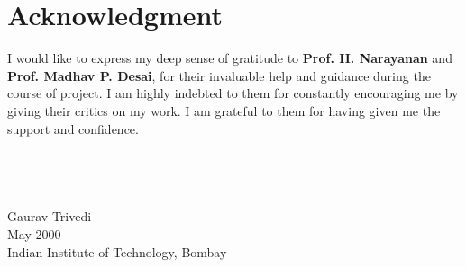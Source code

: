 \chapter*{Acknowledgment}
\vspace{1.0in}
I would like to express my deep sense of gratitude to {\bf Prof. H. Narayanan} and {\bf Prof. Madhav P. Desai}, for their invaluable help and guidance during
the course of project.  I am highly indebted to them for constantly encouraging me by giving their critics on my work. I am grateful to them 
for having given me the support and confidence.
\\
\\
\\
\\
\\
Gaurav Trivedi\\
May 2000\\
{Indian Institute of Technology, Bombay}\\
\newpage
